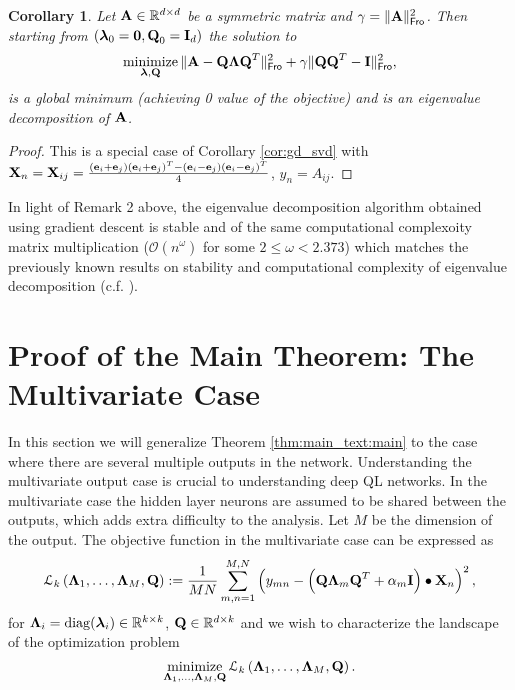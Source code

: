 \documentclass[11pt]{article}
\theoremstyle{plain}
\newtheorem{corollary}{Corollary}
\DeclareMathOperator*{\minimize}{minimize}
\DeclareMathOperator*{\diag}{diag}
\def\R{\mathbb{R}}
\theoremstyle{plain}
\numberwithin{equation}{section}
\numberwithin{lemma}{section}
\numberwithin{theorem}{section}
\numberwithin{corollary}{section}
\numberwithin{observation}{section}
\numberwithin{definition}{section}
\numberwithin{example}{section}
\begin{document}
\begin{corollary} Let $\Mx{A} \in \R^{d \times d}$ be a symmetric matrix and $\gamma = \|\Mx{A}\|_{\sf Fro}^2$. Then starting from $(\V{\lambda}_0 = \V{0},\Mx{Q}_0 = \Mx{I}_d)$ the solution to
\[
\minimize_{\V{\lambda},\Mx{Q}} \|\Mx{A}-\Mx{Q \Lambda Q}^T\|_{\sf Fro}^2 + \gamma \|\Mx{QQ}^T -\Mx{I}\|_{\sf Fro}^2,
\]
is a global minimum (achieving 0 value of the objective) and is an eigenvalue decomposition of $\Mx{A}$.
\end{corollary}
\begin{proof}
This is a special case of Corollary \ref{cor:gd_svd} with $\Mx{X}_n = \Mx{X}_{ij} = \frac{(\V{e}_i+\V{e}_j)(\V{e}_i+\V{e}_j)^T-(\V{e}_i-\V{e}_j)(\V{e}_i-\V{e}_j)^T}{4}$, $y_n = A_{ij}$.
\end{proof}

\noindent In light of Remark 2 above, the eigenvalue decomposition algorithm obtained using gradient descent is stable and of the same computational complexoity matrix multiplication ($\mathcal{O}(n^\omega)$ for some $2 \leq \omega < 2.373$) which matches the previously known results on stability and computational complexity of eigenvalue decomposition (c.f. \cite{demmel2007fast}).


 \section{Proof of the Main Theorem: The Multivariate Case} \label{sec:multivariate}
\renewcommand{\theequation}{\Alph{section}.\arabic{equation}}
\renewcommand{\thefigure}{\Alph{section}.\arabic{figure}}


In this section we will generalize Theorem \ref{thm:main_text:main} to the case where there are several multiple outputs in the network. Understanding the multivariate output case is crucial to understanding deep QL networks. In the multivariate case the hidden layer neurons are assumed to be shared between the outputs, which adds extra difficulty to the analysis. Let $M$ be the dimension of the output. The objective function in the multivariate case can be expressed as
\begin{align} \label{eq:multivariate_mseloss}
\mathcal{L}_k \left( {\Mx{\Lambda}_1, \ldots, \Mx{\Lambda}_M,\Mx{Q}} \right) := \frac{1}{MN}\sum_{m, n = 1}^{M,N} \left(y_{mn}-\left( \Mx{Q}\Mx{\Lambda}_m\Mx{Q}^T+ \alpha_m \Mx{I} \right) \bullet \Mx{X}_n \right)^2, 
\end{align}
for $\Mx{\Lambda}_i = \diag(\V{\lambda}_i) \in \mathbb{R}^{k \times k}$, $\Mx{Q} \in \mathbb{R}^{d \times k}$ and we wish to characterize the landscape of the optimization problem
\begin{equation} \label{eq:multivariate_objective}
\minimize_{\Mx{\Lambda}_1, \ldots, \Mx{\Lambda}_M,\Mx{Q}} \mathcal{L}_k \left( {\Mx{\Lambda}_1, \ldots, \Mx{\Lambda}_M,\Mx{Q}} \right).
\end{equation}
\end{document}

